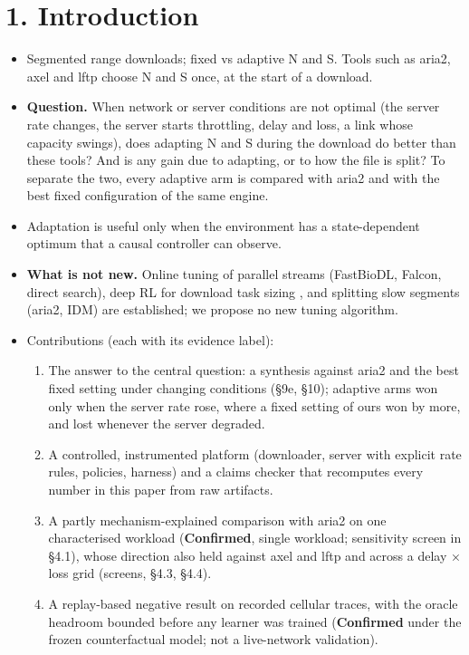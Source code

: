 \documentclass{ieeeaccess}
\begin{document}
\section*{1. Introduction}

\begin{itemize}
\item Segmented range downloads; fixed vs adaptive N and S. Tools such as aria2, axel and lftp choose N and S once, at the start of a download.
\item \textbf{Question.} When network or server conditions are not optimal (the server rate changes, the server starts throttling, delay and loss, a link whose capacity swings), does adapting N and S during the download do better than these tools? And is any gain due to adapting, or to how the file is split? To separate the two, every adaptive arm is compared with aria2 and with the best fixed configuration of the same engine.
\item Adaptation is useful only when the environment has a state-dependent optimum that a causal controller can observe.
\item \textbf{What is not new.} Online tuning of parallel streams (FastBioDL, Falcon, direct search), deep RL for download task sizing \cite{liu2025deload}, and splitting slow segments (aria2, IDM) are established; we propose no new tuning algorithm.
\item Contributions (each with its evidence label):
\begin{enumerate}
\item The answer to the central question: a synthesis against aria2 and the best fixed setting under changing conditions (§9e, §10); adaptive arms won only when the server rate rose, where a fixed setting of ours won by more, and lost whenever the server degraded.
\item A controlled, instrumented platform (downloader, server with explicit rate rules, policies, harness) and a claims checker that recomputes every number in this paper from raw artifacts.
\item A partly mechanism-explained comparison with aria2 on one characterised workload (\textbf{Confirmed}, single workload; sensitivity screen in §4.1), whose direction also held against axel and lftp and across a delay × loss grid (screens, §4.3, §4.4).
\item A replay-based negative result on recorded cellular traces, with the oracle headroom bounded before any learner was trained (\textbf{Confirmed} under the frozen counterfactual model; not a live-network validation).

\end{enumerate}
\end{itemize}
\end{document}

